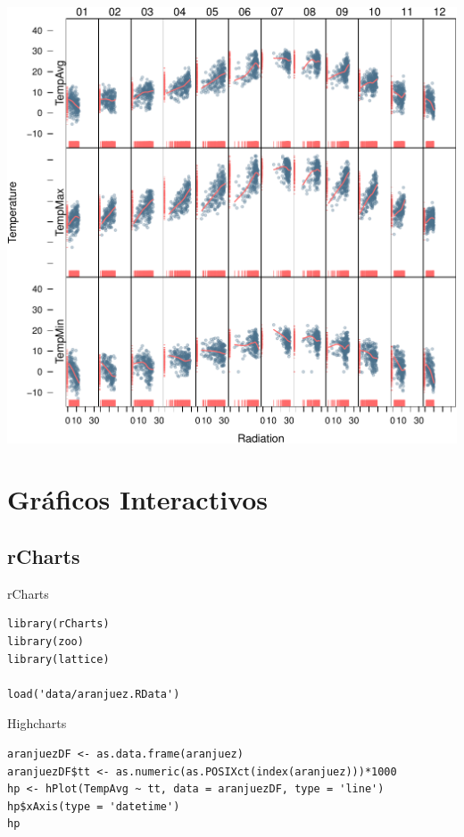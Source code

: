 \documentclass[xcolor={usenames,svgnames,dvipsnames}]{beamer}
\begin{document}
\begin{frame}[label=sec-4-2-4]{}
\includegraphics[width=.9\linewidth]{figs/aranjuezOuterStrips.pdf}
\end{frame}


\section{Gráficos Interactivos}
\label{sec-5}
\subsection{rCharts}
\label{sec-5-1}

\begin{frame}[fragile,label=sec-5-1-1]{rCharts}
 \lstset{language=R,label= ,caption= ,numbers=none}
\begin{lstlisting}
library(rCharts)
library(zoo)
library(lattice)

load('data/aranjuez.RData')
\end{lstlisting}
\end{frame}

\begin{frame}[fragile,label=sec-5-1-2]{Highcharts}
 \lstset{language=R,label= ,caption= ,numbers=none}
\begin{lstlisting}
aranjuezDF <- as.data.frame(aranjuez)
aranjuezDF$tt <- as.numeric(as.POSIXct(index(aranjuez)))*1000
hp <- hPlot(TempAvg ~ tt, data = aranjuezDF, type = 'line')
hp$xAxis(type = 'datetime')
hp
\end{lstlisting}
\end{frame}
\end{document}

